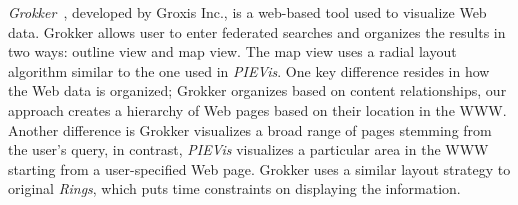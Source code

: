 \documentclass[]{article}
\begin{document}
{%
{\em Grokker}~\cite{grokker}, developed by Groxis Inc., is a web-based tool used to visualize Web data.
Grokker allows user to enter federated searches and organizes the results in two ways: outline view and map view.  The map view uses a radial layout algorithm similar to the one used in {\em PIEVis}.  One key difference resides in how the Web data is organized; Grokker organizes based on content relationships, our approach creates a hierarchy of Web pages based on their location in the WWW.  Another difference is Grokker visualizes a broad range of pages stemming from the user's query, in contrast, {\em PIEVis} visualizes a particular area in the WWW starting from a user-specified Web page.
Grokker uses a similar layout strategy to original {\em Rings}, which puts time constraints on displaying the information.

 
}
\end{document}
